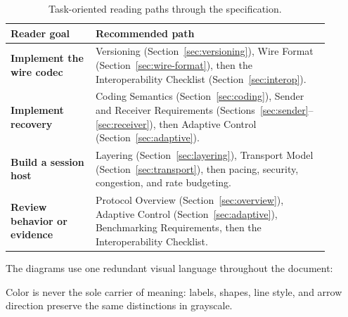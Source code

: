 \documentclass[11pt]{article}
\newcommand{\readerpath}[2]{\textbf{#1} & #2\\}
\begin{document}
\begin{table}[htbp]
\centering
\renewcommand{\arraystretch}{1.25}
\begin{tabular}{>{\raggedright\arraybackslash}p{0.24\linewidth}
                >{\raggedright\arraybackslash}p{0.66\linewidth}}
\toprule
Reader goal & Recommended path \\
\midrule
\readerpath{Implement the wire codec}
  {Versioning (Section~\ref{sec:versioning}), Wire Format
   (Section~\ref{sec:wire-format}), then the Interoperability Checklist
   (Section~\ref{sec:interop}).}
\readerpath{Implement recovery}
  {Coding Semantics (Section~\ref{sec:coding}), Sender and Receiver Requirements
   (Sections~\ref{sec:sender}--\ref{sec:receiver}), then Adaptive Control
   (Section~\ref{sec:adaptive}).}
\readerpath{Build a session host}
  {Layering (Section~\ref{sec:layering}), Transport Model
   (Section~\ref{sec:transport}), then pacing, security, congestion, and rate
   budgeting.}
\readerpath{Review behavior or evidence}
  {Protocol Overview (Section~\ref{sec:overview}), Adaptive Control
   (Section~\ref{sec:adaptive}), Benchmarking Requirements, then the
   Interoperability Checklist.}
\bottomrule
\end{tabular}
\caption{Task-oriented reading paths through the specification.}
\label{tab:reader-paths}
\end{table}

The diagrams use one redundant visual language throughout the document:

\begin{center}
\end{center}

Color is never the sole carrier of meaning: labels, shapes, line style, and arrow
direction preserve the same distinctions in grayscale.
\end{document}
